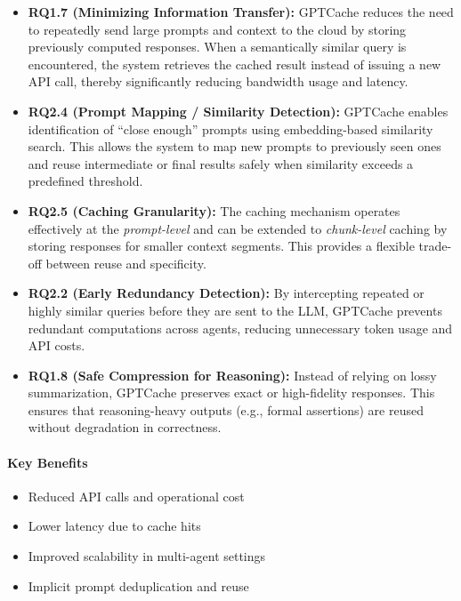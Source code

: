 \documentclass[12pt,a4paper]{article}
\begin{document}
\begin{itemize}
\item \textbf{RQ1.7 (Minimizing Information Transfer):}
GPTCache reduces the need to repeatedly send large prompts and context to the cloud by storing previously computed responses. When a semantically similar query is encountered, the system retrieves the cached result instead of issuing a new API call, thereby significantly reducing bandwidth usage and latency.
\item \textbf{RQ2.4 (Prompt Mapping / Similarity Detection):} 
GPTCache enables identification of ``close enough'' prompts using embedding-based similarity search. This allows the system to map new prompts to previously seen ones and reuse intermediate or final results safely when similarity exceeds a predefined threshold.

\item \textbf{RQ2.5 (Caching Granularity):} 
The caching mechanism operates effectively at the \textit{prompt-level} and can be extended to \textit{chunk-level} caching by storing responses for smaller context segments. This provides a flexible trade-off between reuse and specificity.

\item \textbf{RQ2.2 (Early Redundancy Detection):} 
By intercepting repeated or highly similar queries before they are sent to the LLM, GPTCache prevents redundant computations across agents, reducing unnecessary token usage and API costs.

\item \textbf{RQ1.8 (Safe Compression for Reasoning):} 
Instead of relying on lossy summarization, GPTCache preserves exact or high-fidelity responses. This ensures that reasoning-heavy outputs (e.g., formal assertions) are reused without degradation in correctness.

\end{itemize}

\paragraph{Key Benefits}

\begin{itemize}
\item Reduced API calls and operational cost
\item Lower latency due to cache hits
\item Improved scalability in multi-agent settings
\item Implicit prompt deduplication and reuse
\end{itemize}
\end{document}
